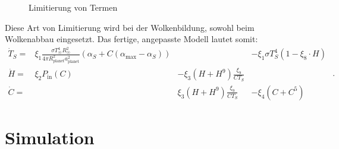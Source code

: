 \begin{refsection}
\begin{figure}[!h]
	\caption{Limitierung von Termen}
	\label{planeten:limit_graph}
\end{figure}
Diese Art von Limitierung wird bei der Wolkenbildung, sowohl beim Wolkenabbau eingesetzt. Das fertige, angepasste Modell lautet somit:
\begin{equation}
\begin{matrix}
\dot{T}_S = & \xi_1 \frac{\sigma T_{\astrosun}^4 R_{\astrosun}^2}{4 \pi R_{\text{planet}}^2 a_{\text{planet}}^2} (\alpha_S + C(\alpha_{\text{max}} - \alpha_S)) && - \xi_1 \sigma T_{S}^4  (1 - \xi_8 \cdot H)\\
\dot{H}   = & \xi_2 P_{\text{in}}(C) & - \xi_3 (H + H^9) \frac{\xi_9}{C T_S}   &                   \\
\dot{C}   = &                        &   \xi_3 (H + H^9) \frac{\xi_9}{C T_S}   & - \xi_4 (C + C^5)
\end{matrix} \text{ .}
\end{equation}

\section{Simulation}


\end{refsection}
